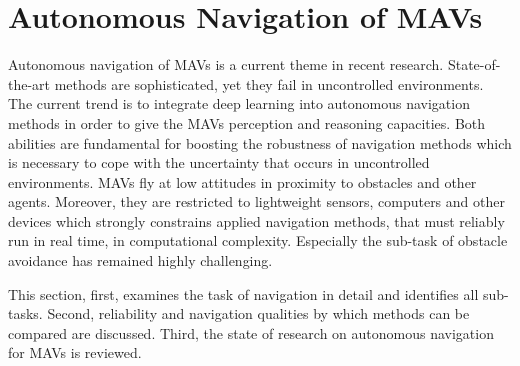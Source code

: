 \section{Autonomous Navigation of MAVs}          \label{sec:autonomous_navigation_of_MAVs}

Autonomous navigation of MAVs is a current theme in recent research.
State-of-the-art methods are sophisticated, yet they fail in uncontrolled environments.
The current trend is to integrate deep learning into autonomous navigation methods
in order to give the MAVs perception and reasoning capacities.
Both abilities are fundamental for boosting the robustness of navigation methods 
which is necessary to cope with the uncertainty that occurs in uncontrolled environments.
MAVs fly at low attitudes in proximity to obstacles and other agents.
Moreover, they are restricted to lightweight sensors, computers and other devices
which strongly constrains applied navigation methods, that must reliably run in real time, in computational complexity.
Especially  the sub-task of obstacle avoidance has remained highly challenging. \cite{Ross2013}

This section, first, examines the task of navigation in detail and identifies all sub-tasks.
Second, reliability and navigation qualities by which methods can be compared are discussed.
Third, the state of research on autonomous navigation for MAVs is reviewed.



%
%
%
%
%
%


